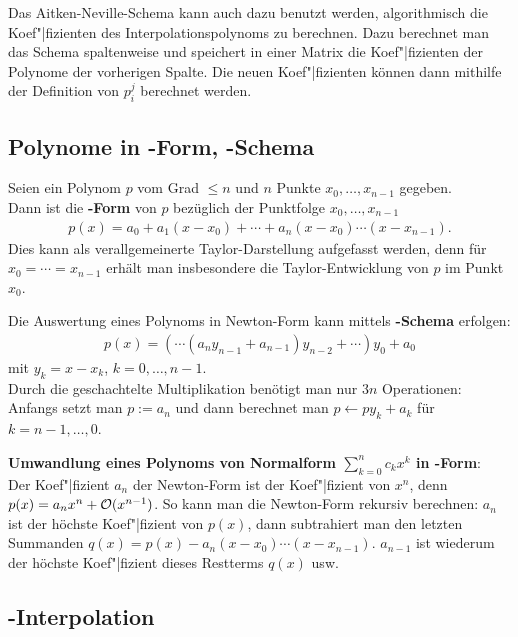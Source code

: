 Das Aitken-Neville-Schema kann auch dazu benutzt werden, algorithmisch
die Koef"|fizienten des Interpolationspolynoms zu berechnen.
Dazu berechnet man das Schema spaltenweise und speichert in einer Matrix
die Koef"|fizienten der Polynome der vorherigen Spalte.
Die neuen Koef"|fizienten können dann mithilfe der Definition von $p_i^j$
berechnet werden.

\subsection{%
    Polynome in -Form, -Schema%
}

Seien ein Polynom $p$ vom Grad $\le n$ und $n$ Punkte $x_0, \dotsc, x_{n-1}$
gegeben. \\
Dann ist die \textbf{-Form} von $p$ bezüglich der Punktfolge
$x_0, \dotsc, x_{n-1}$
\begin{align*}
    p(x) = a_0 + a_1 (x - x_0) + \dotsb + a_n (x - x_0) \dotsm (x - x_{n-1}).
\end{align*}
Dies kann als verallgemeinerte Taylor-Darstellung aufgefasst werden, denn
für $x_0 = \dotsb = x_{n-1}$ erhält man insbesondere die Taylor-Entwicklung
von $p$ im Punkt $x_0$.

\linie

Die Auswertung eines Polynoms in Newton-Form kann mittels
\textbf{-Schema} erfolgen:
\begin{align*}
    p(x) = (\dotsb(a_n y_{n-1} + a_{n-1}) y_{n-2} + \dotsb) y_0 + a_0
\end{align*}
mit $y_k = x - x_k$, $k = 0, \dotsc, n - 1$. \\
Durch die geschachtelte Multiplikation benötigt man nur $3n$ Operationen: \\
Anfangs setzt man $p := a_n$ und dann berechnet man
$p \leftarrow p y_k + a_k$ für $k = n - 1, \dotsc, 0$.

\linie

\textbf{Umwandlung eines Polynoms von Normalform $\sum_{k=0}^n c_k x^k$ in
-Form}: \\
Der Koef"|fizient $a_n$ der Newton-Form ist der Koef"|fizient von $x^n$,
denn $p(x) = a_n x^n + \mathcal{O}(x^{n-1})$.
So kann man die Newton-Form rekursiv berechnen:
$a_n$ ist der höchste Koef"|fizient von $p(x)$, dann subtrahiert man
den letzten Summanden $q(x) = p(x) - a_n (x - x_0) \dotsm (x - x_{n-1})$.
$a_{n-1}$ ist wiederum der höchste Koef"|fizient dieses Restterms $q(x)$ usw.

\subsection{%
    -Interpolation%
}

